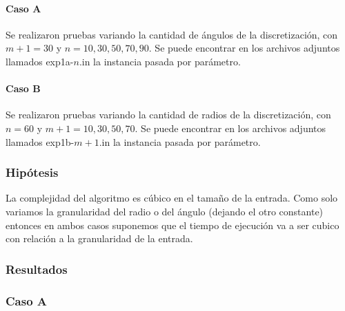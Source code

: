          \paragraph{Caso A} 
          Se realizaron pruebas variando la cantidad de ángulos de la discretización, con $m + 1 = 30$ y $n = 10, 30, 50, 70, 90$. Se puede encontrar en los archivos adjuntos llamados exp1a-$n$.in la instancia pasada por parámetro.

          \paragraph{Caso B} 
          Se realizaron pruebas variando la cantidad de radios de la discretización, con $n = 60$ y $m+1 = 10, 30, 50, 70$. Se puede encontrar en los archivos adjuntos llamados exp1b-$m+1$.in la instancia pasada por parámetro.

      \subsubsection*{Hipótesis}
        La complejidad del algoritmo es cúbico en el tamaño de la entrada. Como solo variamos la granularidad del radio o del ángulo (dejando el otro constante) entonces en ambos casos suponemos que el tiempo de ejecución va a ser cubico con relación a la granularidad de la entrada. 


      \subsubsection*{Resultados}

      \subsubsection*{Caso A}
       
